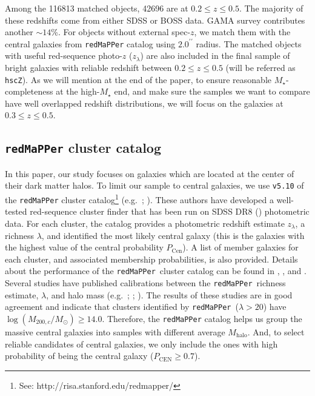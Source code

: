 \documentclass{emulateapj}
\def\arcsec{{\prime\prime}}
\def\redm{\texttt{redMaPPer}}
\def\mstar{{$M_{\star}$}}
\def\mhalo{{$M_{\mathrm{halo}}$}}
\begin{document}
\begin{CJK*}{UTF8}{gbsn}
    Among the 116813 matched objects, 42696 are at $0.2 \leq z \leq 0.5$.
    The majority of these redshifts come from either SDSS or BOSS data.  
    GAMA survey contributes another $\sim 14$\%. 
    For objects without external spec-$z$, we match them with the central galaxies 
    from \redm{} catalog using $2.0^{\arcsec}$ radius. 
    The matched objects with useful red-sequence photo-$z$ ($z_{\lambda}$) are also 
    included in the final sample of bright galaxies with reliable redshift between 
    $0.2 \leq z \leq 0.5$
    (will be referred as \texttt{hscZ}).
    As we will mention at the end of the paper, to ensure reasonable 
    \mstar{}-completeness at the high-\mstar{} end, and make sure the samples we 
    want to compare have well overlapped redshift distributions, we will focus on 
    the galaxies at $0.3 \leq z \leq 0.5$. 

\subsection{\redm{}{} cluster catalog}
    \label{ssec:redmapper}
    
    In this paper, our study focuses on galaxies which are located at the center of
    their dark matter halos. To limit our sample to central galaxies, we use 
    \texttt{v5.10} of the \redm{}{} cluster 
    catalog\footnote{See: http://risa.stanford.edu/redmapper/} 
    (e.g.\ \citealt{Rykoff2014}; \citealt{Rozo2015b}). 
    These authors have developed a well-tested red-sequence cluster finder that has been 
    run on SDSS DR8 (\citealt{SDSSDR8}) photometric data. 
    For each cluster, the catalog provides a photometric redshift estimate $z_{\lambda}$, 
    a richness $\lambda$, and identified the most likely central
    galaxy (this is the galaxies with the highest value of the central probability 
    $P_{\mathrm{Cen}}$). 
    A list of member galaxies for each cluster, and associated membership probabilities, 
    is also provided. 
    Details about the performance of the \redm{}~cluster catalog can be found in 
    \citet{Rozo2014}, \citet{Rozo2015a}, and \citet{Rozo2015b}. 
    Several studies have published calibrations between the \redm{}~richness estimate, 
    $\lambda$, and halo mass (e.g.\ \citealt{Saro2015}; \citealt{Farahi2016}; 
    \citealt{Simet2016}). 
    The results of these studies are in good agreement and indicate that clusters 
    identified by \redm{}~($\lambda > 20$) have $\log (M_{200,c}/M_{\odot}) \geq 14.0$. 
    Therefore, the \redm{} catalog helps us group the massive central galaxies into 
    samples with different average \mhalo{}.  
    And, to select reliable candidates of central galaxies, we only include the ones 
    with high probability of being the central galaxy ($P_{\mathrm{CEN}} \geq 0.7$).
       

\end{CJK*}
\end{document}
